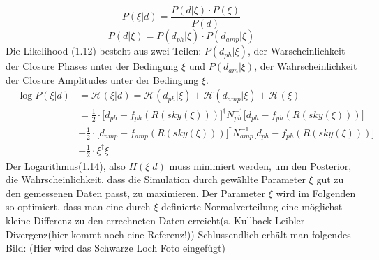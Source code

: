 \documentclass[]{dsadokumentation}
\begin{document}
\begin{equation}
P(\xi|d)= \frac {P(d|\xi)\cdot P(\xi)}{ P(d) }
\end{equation}
\begin{equation}
P(d|\xi)=  {P(d_{ph}|\xi)\cdot P(d_{amp}|\xi)}    
\end{equation}
Die Likelihood (1.12) besteht aus zwei Teilen: $P(d_{ph}|\xi)$, der Warscheinlichkeit der Closure Phases unter der Bedingung $\xi$ und $P(d_{am}| \xi)$, der Wahrscheinlichkeit der Closure Amplitudes unter der Bedingung $\xi$.
\begin{align}
 -\log {P(\xi|d)} &=
 \mathcal{H} (\xi|d) = \mathcal{H} (d_{ph}|\xi)+\mathcal{H} (d_{amp}|\xi)+\mathcal{H} (\xi) \\
&= \frac {1}{2}\cdot \Bigg[d_{ph} - f_{ph}(R(sky(\xi))) \Bigg]^\dagger N^{-1}_{ph} \Bigg[d_{ph} - f_{ph}(R(sky(\xi))) \Bigg]  
\\  & + \frac {1}{2}\cdot \Bigg[d_{amp} - f_{amp}(R(sky(\xi))) \Bigg]^\dagger N_{amp}^{-1}\Bigg[d_{ph} - f_{ph}(R(sky(\xi))) \Bigg]
\\ & +  \frac {1}{2} \cdot \xi^\dagger \xi
\end{align}
Der Logarithmus(1.14), also $H(\xi|d)$ muss minimiert werden, um den Posterior, die Wahrscheinlichkeit, dass die Simulation durch gewählte Parameter $\xi$ gut zu den gemessenen Daten passt, zu maximieren.
Der Parameter $\xi$ wird im Folgenden so optimiert, dass man eine durch $\xi$ definierte Normalverteilung eine möglichst kleine Differenz zu den errechneten Daten erreicht(s. Kullback-Leibler-Divergenz(hier kommt noch eine Referenz!)) %
Schlussendlich erhält man folgendes Bild:
(Hier wird das Schwarze Loch Foto eingefügt)


\printbibliography{}
\end{document}
